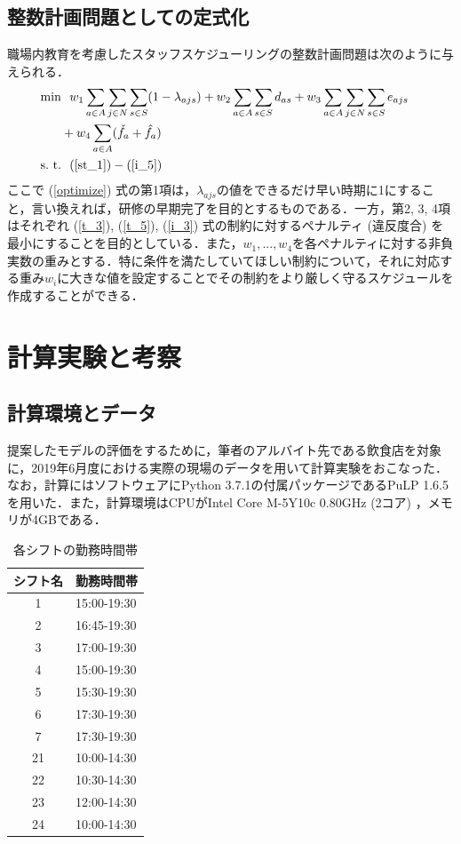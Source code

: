 \documentclass[11pt]{jsarticle}
\begin{document}
\subsection{整数計画問題としての定式化}
職場内教育を考慮したスタッフスケジューリングの整数計画問題は次のように与えられる．
\begin{align}
    \min
    &
    \ \ w_1 \sum_{a \in A}\sum_{j \in N}\sum_{s \in S}(1 - \lambda_{ajs}) + w_2 \sum_{a \in A}\sum_{s \in S} d_{as} + w_3 \sum_{a \in A}\sum_{j \in N}\sum_{s \in S} e_{ajs} \nonumber
    & \\ &
    + w_4 \sum_{a \in A}(\check{f_{a}} + \hat{f_{a}})
    \label{optimize}
    \\
    \mathrm{s. \ t. }
    &
    \ \ (\ref{st_1}) - (\ref{i_5})
    \nonumber
\end{align}
ここで (\ref{optimize}) 式の第1項は，$\lambda_{ajs}$の値をできるだけ早い時期に1にすること，言い換えれば，研修の早期完了を目的とするものである．一方，第2, 3, 4項はそれぞれ (\ref{t_3}), (\ref{t_5}), (\ref{i_3}) 式の制約に対するペナルティ (違反度合) を最小にすることを目的としている．また，$w_1, ..., w_4$を各ペナルティに対する非負実数の重みとする．特に条件を満たしていてほしい制約について，それに対応する重み$w_i$に大きな値を設定することでその制約をより厳しく守るスケジュールを作成することができる．

\newpage
\section{計算実験と考察}
\subsection{計算環境とデータ}
提案したモデルの評価をするために，筆者のアルバイト先である飲食店を対象に，2019年6月度における実際の現場のデータを用いて計算実験をおこなった．なお，計算にはソフトウェアにPython 3.7.1の付属パッケージであるPuLP 1.6.5 \cite{bib:pulp}を用いた．また，計算環境はCPUがIntel Core M-5Y10c 0.80GHz (2コア) ，メモリが4GBである．
\begin{table}[b]
  \begin{center}
    \caption{各シフトの勤務時間帯}
    \begin{tabular}{cl}
      \hline \hline
      シフト名 & 勤務時間帯 \\ \hline
      1 & 15:00-19:30 \\
      2 & 16:45-19:30 \\
      3 & 17:00-19:30 \\
      4 & 15:00-19:30 \\
      5 & 15:30-19:30 \\
      6 & 17:30-19:30 \\
      7 & 17:30-19:30 \\
      21 & 10:00-14:30 \\
      22 & 10:30-14:30 \\
      23 & 12:00-14:30 \\
      24 & 10:00-14:30 \\ \hline \hline
    \end{tabular}
    \label{tab:shift_time}
  \end{center}
\end{table}
\end{document}
